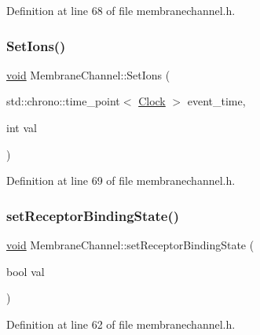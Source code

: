 Definition at line 68 of file membranechannel.\+h.

\mbox{\label{class_membrane_channel_a1fe0c61eccbb6aa0d905ead27e8337bd}} 
\subsubsection{\texorpdfstring{Set\+Ions()}{SetIons()}}
{\footnotesize\ttfamily \mbox{\hyperlink{glad_8h_a950fc91edb4504f62f1c577bf4727c29}{void}} Membrane\+Channel\+::\+Set\+Ions (\begin{DoxyParamCaption}\item[{std\+::chrono\+::time\+\_\+point$<$ \mbox{\hyperlink{universe_8h_a0ef8d951d1ca5ab3cfaf7ab4c7a6fd80}{Clock}} $>$}]{event\+\_\+time,  }\item[{int}]{val }\end{DoxyParamCaption})\hspace{0.3cm}{\ttfamily [inline]}}



Definition at line 69 of file membranechannel.\+h.

\mbox{\label{class_membrane_channel_a9f5c69ab1f4dce6113fceebaaa4f15f4}} 
\subsubsection{\texorpdfstring{set\+Receptor\+Binding\+State()}{setReceptorBindingState()}}
{\footnotesize\ttfamily \mbox{\hyperlink{glad_8h_a950fc91edb4504f62f1c577bf4727c29}{void}} Membrane\+Channel\+::set\+Receptor\+Binding\+State (\begin{DoxyParamCaption}\item[{bool}]{val }\end{DoxyParamCaption})\hspace{0.3cm}{\ttfamily [inline]}}



Definition at line 62 of file membranechannel.\+h.

